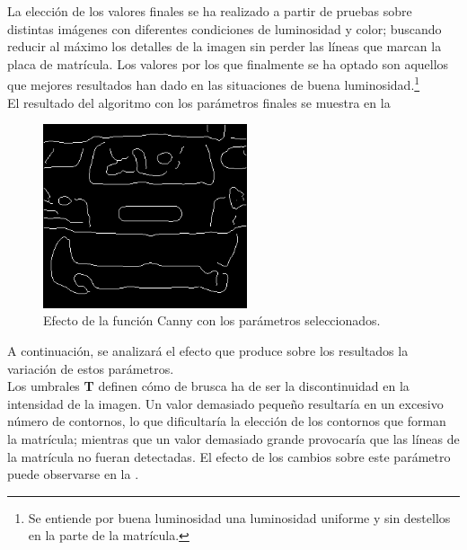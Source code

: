 La elección de los valores finales se ha realizado a partir de pruebas sobre distintas imágenes con diferentes condiciones de luminosidad y color; buscando reducir al máximo los detalles de la imagen sin perder las líneas que marcan la placa de matrícula. Los valores por los que finalmente se ha optado son aquellos que mejores resultados han dado en las situaciones de buena luminosidad.\footnote{Se entiende por buena luminosidad una luminosidad uniforme y sin destellos en la parte de la matrícula.}\\

El resultado del algoritmo con los parámetros finales se muestra en la 


\begin{figure}[!h]
\centering
\includegraphics[width=6cm]{EjemploCanny.png}
\caption{\small{Efecto de la función Canny con los parámetros seleccionados.}}
\label{Cannyfinal}
\end{figure}

A continuación, se analizará el efecto que produce sobre los resultados la variación de estos parámetros.\\

Los umbrales \textbf {T} definen cómo de brusca ha de ser la discontinuidad en la intensidad de la imagen. Un valor demasiado pequeño resultaría en un excesivo número de contornos, lo que dificultaría la elección de los contornos que forman la matrícula; mientras que un valor demasiado grande provocaría que las líneas de la matrícula no fueran detectadas.  El efecto de los cambios sobre este parámetro puede observarse en la .

